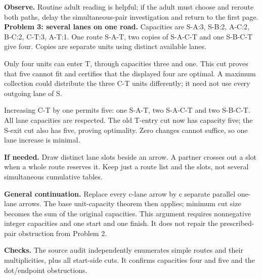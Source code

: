 \documentclass[11pt]{article}
\begin{document}
\textbf{Observe.} Routine adult reading is helpful; if the adult must choose and reroute both paths, delay the simultaneous-pair investigation and return to the first page.
\newpage
\textbf{Problem 3: several lanes on one road.} Capacities are S-A:3, S-B:2, A-C:2, B-C:2, C-T:3, A-T:1. One route S-A-T, two copies of S-A-C-T and one S-B-C-T give four. Copies are separate units using distinct available lanes.

Only four units can enter T, through capacities three and one. This cut proves that five cannot fit and certifies that the displayed four are optimal. A maximum collection could distribute the three C-T units differently; it need not use every outgoing lane of S.

Increasing C-T by one permits five: one S-A-T, two S-A-C-T and two S-B-C-T. All lane capacities are respected. The old T-entry cut now has capacity five; the S-exit cut also has five, proving optimality. Zero changes cannot suffice, so one lane increase is minimal.

\textbf{If needed.} Draw distinct lane slots beside an arrow. A partner crosses out a slot when a whole route reserves it. Keep just a route list and the slots, not several simultaneous cumulative tables.

\textbf{General continuation.} Replace every c-lane arrow by c separate parallel one-lane arrows. The base unit-capacity theorem then applies; minimum cut size becomes the sum of the original capacities. This argument requires nonnegative integer capacities and one start and one finish. It does not repair the prescribed-pair obstruction from Problem 2.

\textbf{Checks.} The source audit independently enumerates simple routes and their multiplicities, plus all start-side cuts. It confirms capacities four and five and the dot/endpoint obstructions.
\end{document}
